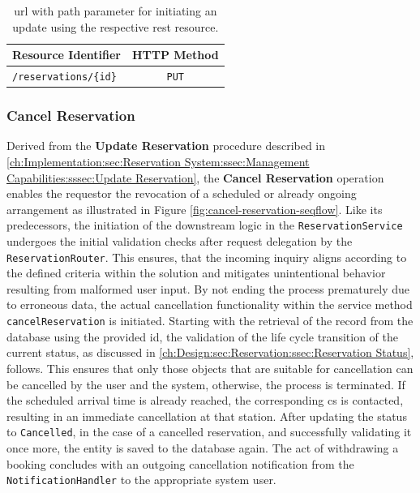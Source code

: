 \begingroup
\setlength{\tabcolsep}{10pt} %
\renewcommand{\arraystretch}{1.5} %
\begin{table}[h]
\centering
\caption{\acrshort{url} with path parameter for initiating an update using the respective \acrshort{rest} resource.}
    \begin{tabular}{l|c}
    Resource Identifier & HTTP Method \\ \hline
    \texttt{/reservations/\{id\}} & \texttt{PUT}
    \end{tabular}
\label{tab:update-reservation-rest}
\end{table}
\endgroup

\newpage

\subsubsection{Cancel Reservation}
\label{ch:Implementation:sec:Reservation System:ssec:Management Capabilities:sssec:Cancel Reservation}

Derived from the \textbf{Update Reservation} procedure described in \ref{ch:Implementation:sec:Reservation System:ssec:Management Capabilities:sssec:Update Reservation}, the \textbf{Cancel Reservation} operation enables the requestor the revocation of a scheduled or already ongoing arrangement as illustrated in Figure \ref{fig:cancel-reservation-seqflow}.
Like its predecessors, the initiation of the downstream logic in the \texttt{ReservationService} undergoes the initial validation checks after request delegation by the \texttt{ReservationRouter}.
This ensures, that the incoming inquiry aligns according to the defined criteria within the solution and mitigates unintentional behavior resulting from malformed user input.
By not ending the process prematurely due to erroneous data, the actual cancellation functionality within the service method \texttt{cancelReservation} is initiated.
Starting with the retrieval of the record from the database using the provided \acrshort{id}, the validation of the life cycle transition of the current status, as discussed in \ref{ch:Design:sec:Reservation:ssec:Reservation Status}, follows.
This ensures that only those objects that are suitable for cancellation can be cancelled by the user and the system, otherwise, the process is terminated.
If the scheduled arrival time is already reached, the corresponding \acrshort{cs} is contacted, resulting in an immediate cancellation at that station.
After updating the status to \texttt{Cancelled}, in the case of a cancelled reservation, and successfully validating it once more, the entity is saved to the database again. The act of withdrawing a booking concludes with an outgoing cancellation notification from the \texttt{NotificationHandler} to the appropriate system user.

